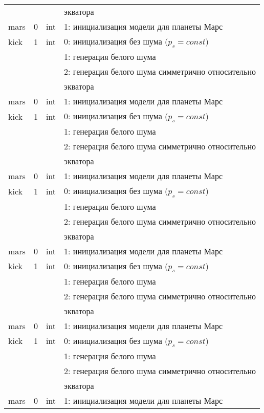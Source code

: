 \begin{longtable}[c]{|l|c|l|l|}
      & & & экватора    \\
     mars & 0 & int & 1: инициализация модели для планеты Марс     \\
    kick & 1 & int & 0: инициализация без шума ($p_s = const$) \\
          &   &     & 1: генерация белого шума                  \\
          &   &     & 2: генерация белого шума симметрично относительно \\
      & & & экватора    \\
     mars & 0 & int & 1: инициализация модели для планеты Марс     \\
    kick & 1 & int & 0: инициализация без шума ($p_s = const$) \\
          &   &     & 1: генерация белого шума                  \\
          &   &     & 2: генерация белого шума симметрично относительно \\
      & & & экватора    \\
     mars & 0 & int & 1: инициализация модели для планеты Марс     \\
    kick & 1 & int & 0: инициализация без шума ($p_s = const$) \\
          &   &     & 1: генерация белого шума                  \\
          &   &     & 2: генерация белого шума симметрично относительно \\
      & & & экватора    \\
     mars & 0 & int & 1: инициализация модели для планеты Марс     \\
    kick & 1 & int & 0: инициализация без шума ($p_s = const$) \\
          &   &     & 1: генерация белого шума                  \\
          &   &     & 2: генерация белого шума симметрично относительно \\
      & & & экватора    \\
     mars & 0 & int & 1: инициализация модели для планеты Марс     \\
    kick & 1 & int & 0: инициализация без шума ($p_s = const$) \\
          &   &     & 1: генерация белого шума                  \\
          &   &     & 2: генерация белого шума симметрично относительно \\
      & & & экватора    \\
     mars & 0 & int & 1: инициализация модели для планеты Марс     \\

\end{longtable}
